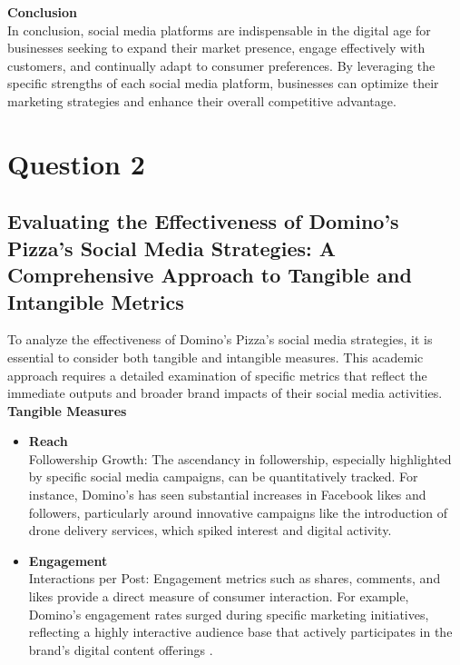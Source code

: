 \documentclass[12pt,a4paper]{article}
\begin{document}
\noindent \textbf{Conclusion}\\
In conclusion, social media platforms are indispensable in the digital age for businesses seeking to expand their market presence, engage effectively with customers, and continually adapt to consumer preferences. By leveraging the specific strengths of each social media platform, businesses can optimize their marketing strategies and enhance their overall competitive advantage.\\



\pagebreak %



\setcounter{page}{2}

\section{Question 2}
\subsection{Evaluating the Effectiveness of Domino's Pizza's Social Media Strategies: A Comprehensive Approach to Tangible and Intangible Metrics}
\label{sec:Question 2}


To analyze the effectiveness of Domino's Pizza's social media strategies, it is essential to consider both tangible and intangible measures. This academic approach requires a detailed examination of specific metrics that reflect the immediate outputs and broader brand impacts of their social media activities.\\

\noindent\textbf{Tangible Measures}

\begin{itemize}
    \item \textbf{Reach} \\
    \noindent Followership Growth: The ascendancy in followership, especially highlighted by specific social media campaigns, can be quantitatively tracked. For instance, Domino's has seen substantial increases in Facebook likes and followers, particularly around innovative campaigns like the introduction of drone delivery services, which spiked interest and digital activity\citep{question_2.1}.\\
    
    \item \textbf{Engagement}\\
    \noindent Interactions per Post: Engagement metrics such as shares, comments, and likes provide a direct measure of consumer interaction. For example, Domino's engagement rates surged during specific marketing initiatives, reflecting a highly interactive audience base that actively participates in the brand's digital content offerings \citep{question_2.2}.\\
\end{itemize}
\end{document}
